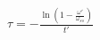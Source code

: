 \documentclass[preview]{standalone}
\begin{document}
\begin{center}
$\tau=-\frac{\ln\left(1-\frac{\omega'}{\omega_{ss}}\right)}{t'}$
\end{center}
\end{document}
